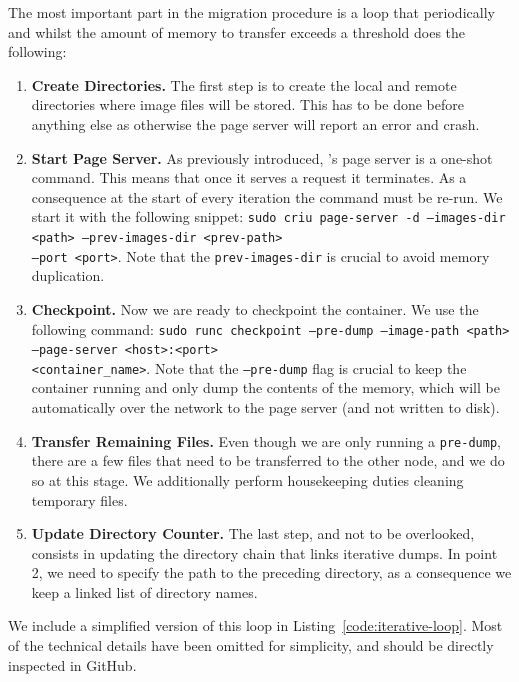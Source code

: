 The most important part in the migration procedure is a loop that periodically and whilst the amount of memory to transfer exceeds a threshold does the following:
\begin{enumerate}
    \item \textbf{Create Directories.} The first step is to create the local and remote directories where image files will be stored. This has to be done before anything else as otherwise the page server will report an error and crash.
    \item \textbf{Start Page Server.} As previously introduced, \criu's page server is a one-shot command. This means that once it serves a request it terminates. As a consequence at the start of every iteration the command must be re-run. We start it with the following snippet: \texttt{sudo criu page-server -d --images-dir <path> --prev-images-dir <prev-path>} \\\texttt{--port <port>}. Note that the \texttt{prev-images-dir} is crucial to avoid memory duplication.
    \item \textbf{Checkpoint.} Now we are ready to checkpoint the container. We use the following command: \texttt{sudo runc checkpoint --pre-dump --image-path <path> --page-server <host>:<port>} \\\texttt{<container\_name>}. Note that the \texttt{--pre-dump} flag is crucial to keep the container running and only dump the contents of the memory, which will be automatically over the network to the page server (and not written to disk).
    \item \textbf{Transfer Remaining Files.} Even though we are only running a \texttt{pre-dump}, there are a few files that need to be transferred to the other node, and we do so at this stage. We additionally perform housekeeping duties cleaning temporary files.
    \item \textbf{Update Directory Counter.} The last step, and not to be overlooked, consists in updating the directory chain that links iterative dumps. In point 2, we need to specify the path to the preceding directory, as a consequence we keep a linked list of directory names.
\end{enumerate}
We include a simplified version of this loop in Listing~\ref{code:iterative-loop}.
Most of the technical details have been omitted for simplicity, and should be directly inspected in GitHub.
